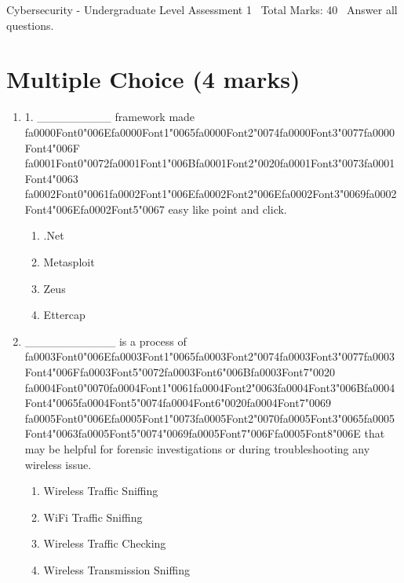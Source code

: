 \documentclass[12pt]{article}
\begin{document}
\begin{center}
Cybersecurity - Undergraduate Level Assessment 1 \
Total Marks: 40 \
Answer all questions.
\end{center}

\section*{Multiple Choice (4 marks)}
\begin{enumerate}[label=\arabic*.]
\item 1. \_\_\_\_\_\_\_\_\_ framework made {\csname fa0000Font0\endcsname\char"006E}{\csname fa0000Font1\endcsname\char"0065}{\csname fa0000Font2\endcsname\char"0074}{\csname fa0000Font3\endcsname\char"0077}{\csname fa0000Font4\endcsname\char"006F} {\csname fa0001Font0\endcsname\char"0072}{\csname fa0001Font1\endcsname\char"006B}{\csname fa0001Font2\endcsname\char"0020}{\csname fa0001Font3\endcsname\char"0073}{\csname fa0001Font4\endcsname\char"0063} {\csname fa0002Font0\endcsname\char"0061}{\csname fa0002Font1\endcsname\char"006E}{\csname fa0002Font2\endcsname\char"006E}{\csname fa0002Font3\endcsname\char"0069}{\csname fa0002Font4\endcsname\char"006E}{\csname fa0002Font5\endcsname\char"0067} easy like point and click.
\begin{enumerate}[label=(\alph*)]
    \item .Net
    \item Metasploit
    \item Zeus
    \item Ettercap
\end{enumerate}
\item \_\_\_\_\_\_\_\_\_\_\_ is a process of {\csname fa0003Font0\endcsname\char"006E}{\csname fa0003Font1\endcsname\char"0065}{\csname fa0003Font2\endcsname\char"0074}{\csname fa0003Font3\endcsname\char"0077}{\csname fa0003Font4\endcsname\char"006F}{\csname fa0003Font5\endcsname\char"0072}{\csname fa0003Font6\endcsname\char"006B}{\csname fa0003Font7\endcsname\char"0020} {\csname fa0004Font0\endcsname\char"0070}{\csname fa0004Font1\endcsname\char"0061}{\csname fa0004Font2\endcsname\char"0063}{\csname fa0004Font3\endcsname\char"006B}{\csname fa0004Font4\endcsname\char"0065}{\csname fa0004Font5\endcsname\char"0074}{\csname fa0004Font6\endcsname\char"0020}{\csname fa0004Font7\endcsname\char"0069} {\csname fa0005Font0\endcsname\char"006E}{\csname fa0005Font1\endcsname\char"0073}{\csname fa0005Font2\endcsname\char"0070}{\csname fa0005Font3\endcsname\char"0065}{\csname fa0005Font4\endcsname\char"0063}{\csname fa0005Font5\endcsname\char"0074}{\char"0069}{\csname fa0005Font7\endcsname\char"006F}{\csname fa0005Font8\endcsname\char"006E} that may be helpful for forensic investigations or during troubleshooting any wireless issue.
\begin{enumerate}[label=(\alph*)]
    \item Wireless Traffic Sniffing
    \item WiFi Traffic Sniffing
    \item Wireless Traffic Checking
    \item Wireless Transmission Sniffing
\end{enumerate}
\end{enumerate}
\end{document}
